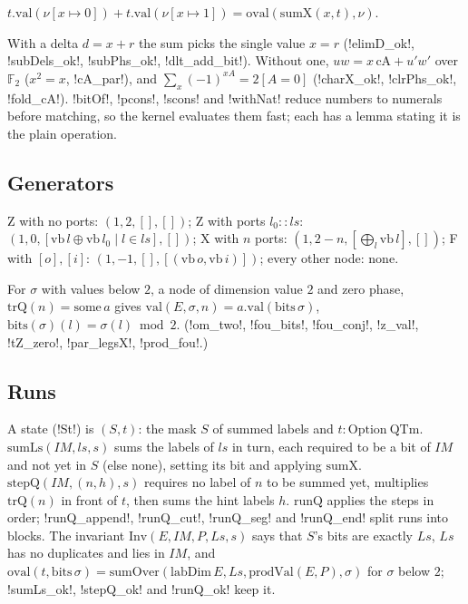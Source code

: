 \begin{theorem}
$t.\mathrm{val}(\nu[x\mapsto0])+t.\mathrm{val}(\nu[x\mapsto1])=\mathrm{oval}(\mathrm{sumX}(x,t),\nu)$.
\end{theorem}

With a delta $d=x+r$ the sum picks the single value $x=r$ (\lean!elimD_ok!, \lean!subDels_ok!, \lean!subPhs_ok!, \lean!dlt_add_bit!). Without one, $uw=x\,\mathrm{cA}+u'w'$ over $\mathbb{F}_2$ ($x^2=x$, \lean!cA_par!), and $\sum_x(-1)^{xA}=2[A=0]$ (\lean!charX_ok!, \lean!clrPhs_ok!, \lean!fold_cA!). \lean!bitOf!, \lean!pcons!, \lean!scons! and \lean!withNat! reduce numbers to numerals before matching, so the kernel evaluates them fast; each has a lemma stating it is the plain operation.

\subsection{Generators}

\begin{definition}
Z with no ports: $(1,2,[],[])$; Z with ports $l_0\mathbin{::}ls$: $(1,0,[\mathrm{vb}\,l\oplus\mathrm{vb}\,l_0\mid l\in ls],[])$; X with $n$ ports: $(1,2-n,[\bigoplus_l\mathrm{vb}\,l],[])$; F with $[o],[i]$: $(1,-1,[],[(\mathrm{vb}\,o,\mathrm{vb}\,i)])$; every other node: $\mathrm{none}$.
\end{definition}

\begin{theorem}
For $\sigma$ with values below $2$, a node of dimension value $2$ and zero phase, $\mathrm{trQ}(n)=\mathrm{some}\,a$ gives $\mathrm{val}(E,\sigma,n)=a.\mathrm{val}(\mathrm{bits}\,\sigma)$, $\mathrm{bits}(\sigma)(l)=\sigma(l)\bmod2$. (\lean!om_two!, \lean!fou_bits!, \lean!fou_conj!, \lean!z_val!, \lean!tZ_zero!, \lean!par_legsX!, \lean!prod_fou!.)
\end{theorem}

\subsection{Runs}

A state (\lean!St!) is $(S,t)$: the mask $S$ of summed labels and $t:\mathrm{Option\ QTm}$. $\mathrm{sumLs}(\mathit{IM},ls,s)$ sums the labels of $ls$ in turn, each required to be a bit of $\mathit{IM}$ and not yet in $S$ (else $\mathrm{none}$), setting its bit and applying $\mathrm{sumX}$. $\mathrm{stepQ}(\mathit{IM},(n,h),s)$ requires no label of $n$ to be summed yet, multiplies $\mathrm{trQ}(n)$ in front of $t$, then sums the hint labels $h$. $\mathrm{runQ}$ applies the steps in order; \lean!runQ_append!, \lean!runQ_cut!, \lean!runQ_seg! and \lean!runQ_end! split runs into blocks. The invariant $\mathrm{Inv}(E,\mathit{IM},P,Ls,s)$ says that $S$'s bits are exactly $Ls$, $Ls$ has no duplicates and lies in $\mathit{IM}$, and $\mathrm{oval}(t,\mathrm{bits}\,\sigma)=\mathrm{sumOver}(\mathrm{labDim}\,E,Ls,\mathrm{prodVal}(E,P),\sigma)$ for $\sigma$ below $2$; \lean!sumLs_ok!, \lean!stepQ_ok! and \lean!runQ_ok! keep it.

